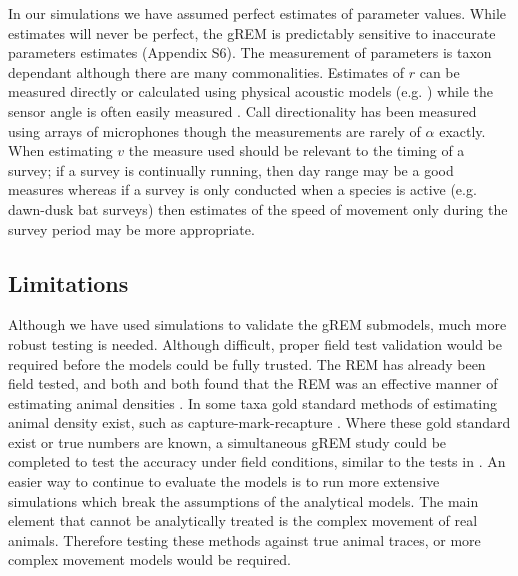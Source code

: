 \documentclass[a4paper,10pt,reqno,oneside]{amsart}
\begin{document}
In our simulations we have assumed perfect estimates of parameter values. While estimates will never be perfect, the gREM is predictably sensitive to inaccurate parameters estimates (Appendix S6). The measurement of parameters is taxon dependant although there are many commonalities. Estimates of $r$ can be measured directly or calculated using physical acoustic models (e.g. \citep{holderied2003echolocation}) while the sensor angle is often easily measured \citep{adams2012you}. Call directionality has been measured using arrays of microphones \citep{brinklov2011} though the measurements are rarely of $\alpha$ exactly. When estimating $v$ the measure used should be relevant to the timing of a survey; if a survey is continually running, then day range may be a good measures \citep{carbone2005far} whereas if a survey is only conducted when a species is active (e.g. dawn-dusk bat surveys) then estimates of the speed of movement only during the survey period may be more appropriate. 

\subsection*{Limitations}
Although we have used simulations to validate the gREM submodels, much more robust testing is needed. Although difficult, proper field test validation would be required before the models could be fully trusted.  The REM \citep{rowcliffe2008estimating} has already been field tested, and both \citet{rowcliffe2008estimating} and \citet{zero2013monitoring} both found that the REM was an effective manner of estimating animal densities \citep{rowcliffe2008estimating, zero2013monitoring}. In some taxa gold standard methods of estimating animal density exist, such as capture-mark-recapture \citep{sollmann2013using}. Where these gold standard exist or true numbers are known, a simultaneous gREM study could be completed to test the accuracy under field conditions, similar to the tests in \citet{rowcliffe2008estimating}. An easier way to continue to evaluate the models is to run more extensive simulations which break the assumptions of the analytical models. The main element that cannot be analytically treated is the complex movement of real animals. Therefore testing these methods against true animal traces, or more complex movement models would be required.
\end{document}
